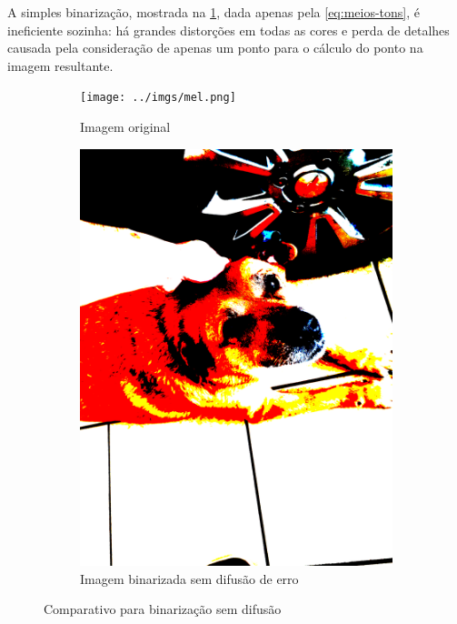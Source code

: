 \documentclass[brazilian,a4paper,twocolumn]{article}
\begin{document}
        A simples binarização, mostrada na \cref{fig:binarizada-sem_difusao}, dada apenas pela \cref{eq:meios-tons}, é ineficiente sozinha: há grandes distorções em todas as cores e perda de detalhes causada pela consideração de apenas um ponto para o cálculo do ponto na imagem resultante.

        \begin{figure}
            \centering
            \begin{subfigure}{0.24\textwidth}
                \texttt{[image: ../imgs/mel.png]}
                \caption{Imagem original}
            \end{subfigure}
            \begin{subfigure}{0.24\textwidth}
                \includegraphics[width=\textwidth,keepaspectratio]{../imgs/mel-binarizada.png}
                \caption{Imagem binarizada sem difusão de erro}
            \end{subfigure}

            \caption{Comparativo para binarização sem difusão}
            \label{fig:binarizada-sem_difusao}
        \end{figure}
\end{document}

